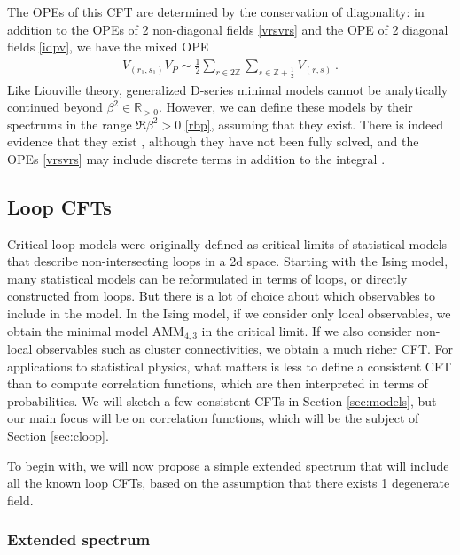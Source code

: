 \documentclass[12pt, a4paper]{article}
\theoremstyle{break}
\begin{document}
The OPEs of this CFT are determined by the conservation of diagonality: in addition to the OPEs of 2 non-diagonal fields \eqref{vrsvrs} and the OPE of 2 diagonal fields \eqref{idpv}, we have the mixed OPE 
\begin{align}
 V_{(r_1,s_1)}V_P \sim \frac12 \sum_{r\in 2\mathbb{Z}}\sum_{s\in \mathbb{Z}+\frac12} V_{(r,s)} \ . 
\end{align}
Like Liouville theory, generalized D-series minimal models cannot be analytically continued beyond $\beta^2\in \mathbb{R}_{>0}$. However, we can define these models by their spectrums in the range $\Re\beta^2>0$ \eqref{rbp}, assuming that they exist. There is indeed evidence that they exist \cite{mr17}, although they have not been fully solved, and the OPEs \eqref{vrsvrs} may include discrete terms in addition to the integral \cite{rib19}. 


\subsection{Loop CFTs}

Critical loop models were originally defined as critical limits of statistical models that describe non-intersecting loops in a 2d space. Starting with the Ising model, many statistical models can be reformulated in terms of loops, or directly constructed from loops. But there is a lot of choice about which observables to include in the model. In the Ising model, if we consider only local observables, we obtain the minimal model $\text{AMM}_{4,3}$ in the critical limit. If we also consider non-local observables such as cluster connectivities, we obtain a much richer CFT. For applications to statistical physics, what matters is less to define a consistent CFT than to compute correlation functions, which are then interpreted in terms of probabilities. We will sketch a few consistent CFTs in Section \ref{sec:models}, but our main focus will be on correlation functions, which will be the subject of Section \ref{sec:cloop}.

To begin with, we will now propose a simple extended spectrum that will include all the known loop CFTs, based on the assumption that there exists 1 degenerate field. 

\subsubsection{Extended spectrum}
\end{document}
